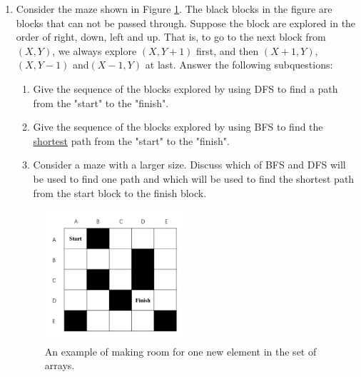 \documentclass[12pt,a4paper]{article}
\theoremstyle{definition}
\begin{document}
\begin{enumerate}
    \item Consider the maze shown in Figure \ref{Fig-Maze}. The black blocks in the figure are blocks that can not be passed through. Suppose the block are explored in the order of right, down, left and up. That is, to go to the next block from $(X,Y)$, we always explore $(X,Y+1)$ first, and then $(X+1,Y)$,$(X,Y-1)$ and$(X-1,Y)$ at last. Answer the following subquestions:
    \begin{enumerate}
        \item Give the sequence of the blocks explored by using DFS to find a path from the "start" to the "finish".
        \item Give the sequence of the blocks explored by using BFS to find the \underline{shortest} path from the "start" to the "finish".
        \item Consider a maze with a larger size. Discuss which of BFS and DFS will be used to find one path and which will be used to find the shortest path from the start block to the finish block.
    \end{enumerate}
    
    \begin{figure}[!htbp]
	\centering
	\includegraphics[width=0.5\textwidth]{Fig-Maze.pdf}
	\caption{An example of making room for one new element in the set of arrays.}
	\label{Fig-Maze}
	\end{figure}
	

\end{enumerate}
\end{document}
